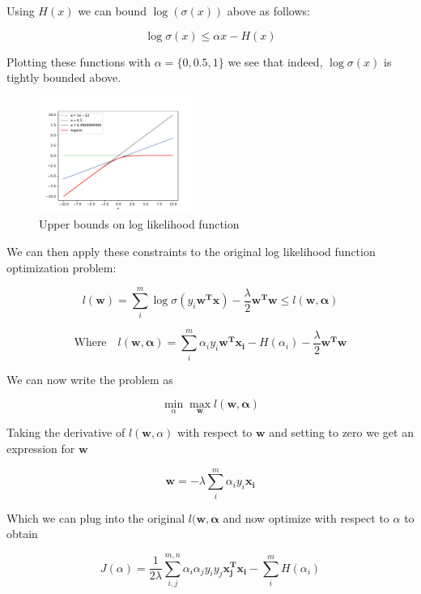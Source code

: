 \documentclass[11pt]{amsart}
\newcommand{\vek}[1]{\mathbf{#1}}
\begin{document}
Using $H(x)$ we can bound $\log(\sigma(x))$ above as follows:

\begin{equation}
\log\sigma(x) \leq \alpha x - H(x)
\end{equation} 

Plotting these functions with $\alpha = \{0, 0.5, 1\}$ we see that indeed, $\log\sigma(x)$ is tightly bounded above.

\begin{figure}
\includegraphics[width=0.45\textwidth]{bounds.pdf}
\caption{Upper bounds on log likelihood function}
\end{figure}

We can then apply these constraints to the original log likelihood function optimization problem:

\begin{equation}
l(\vek{w}) = \sum_{i}^{m} \log \sigma(y_i\vek{w^T}\vek{x}) - \frac{\lambda}{2}\vek{w^T}\vek{w} \leq l(\vek{w}, \vek{\alpha})
\end{equation}

\begin{equation}
\text{Where}\quad l(\vek{w}, \vek{\alpha}) = \sum_{i}^{m} \alpha_{i}y_{i}\vek{w^Tx_i} - H(\alpha_i) - \frac{\lambda}{2}\vek{w^Tw}
\end{equation}

We can now write the problem as

\begin{equation}
\min_{\alpha}\max_{\vek{w}} l(\vek{w}, \vek{\alpha})
\end{equation}

Taking the derivative of $l(\vek{w}, \alpha)$ with respect to $\vek{w}$ and setting to zero we get an expression for $\vek{w}$

\begin{equation}
\vek{w} = -\lambda\sum_{i}^{m}\alpha_{i}y_{i}\vek{x_i}
\end{equation}

Which we can plug into the original $l(\vek{w}, \vek{\alpha}$ and now optimize with respect to $\alpha$ to obtain

\begin{equation}
J(\alpha) = \frac{1}{2\lambda}\sum_{i,j}^{m,n}\alpha_{i}\alpha_{j}y_{i}y_{j}\vek{x_{j}^{T}x_{i}} - \sum_{i}^{m}H(\alpha_i)
\end{equation}



\end{document}
